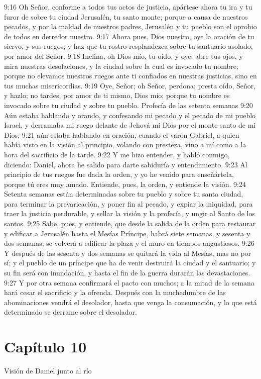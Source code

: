 9:16 Oh Señor, conforme a todos tus actos de justicia, apártese ahora tu ira y tu furor de sobre tu ciudad Jerusalén, tu santo monte; porque a causa de nuestros pecados, y por la maldad de nuestros padres, Jerusalén y tu pueblo son el oprobio de todos en derredor nuestro. 
9:17 Ahora pues, Dios nuestro, oye la oración de tu siervo, y sus ruegos; y haz que tu rostro resplandezca sobre tu santuario asolado, por amor del Señor. 
9:18 Inclina, oh Dios mío, tu oído, y oye; abre tus ojos, y mira nuestras desolaciones, y la ciudad sobre la cual es invocado tu nombre; porque no elevamos nuestros ruegos ante ti confiados en nuestras justicias, sino en tus muchas misericordias. 
9:19 Oye, Señor; oh Señor, perdona; presta oído, Señor, y hazlo; no tardes, por amor de ti mismo, Dios mío; porque tu nombre es invocado sobre tu ciudad y sobre tu pueblo. 
Profecía de las setenta semanas 
9:20 Aún estaba hablando y orando, y confesando mi pecado y el pecado de mi pueblo Israel, y derramaba mi ruego delante de Jehová mi Dios por el monte santo de mi Dios; 
9:21 aún estaba hablando en oración, cuando el varón Gabriel, a quien había visto en la visión al principio, volando con presteza, vino a mí como a la hora del sacrificio de la tarde. 
9:22 Y me hizo entender, y habló conmigo, diciendo: Daniel, ahora he salido para darte sabiduría y entendimiento. 
9:23 Al principio de tus ruegos fue dada la orden, y yo he venido para enseñártela, porque tú eres muy amado. Entiende, pues, la orden, y entiende la visión. 
9:24 Setenta semanas están determinadas sobre tu pueblo y sobre tu santa ciudad, para terminar la prevaricación, y poner fin al pecado, y expiar la iniquidad, para traer la justicia perdurable, y sellar la visión y la profecía, y ungir al Santo de los santos. 
9:25 Sabe, pues, y entiende, que desde la salida de la orden para restaurar y edificar a Jerusalén hasta el Mesías Príncipe, habrá siete semanas, y sesenta y dos semanas; se volverá a edificar la plaza y el muro en tiempos angustiosos. 
9:26 Y después de las sesenta y dos semanas se quitará la vida al Mesías, mas no por sí; y el pueblo de un príncipe que ha de venir destruirá la ciudad y el santuario; y su fin será con inundación, y hasta el fin de la guerra durarán las devastaciones. 
9:27 Y por otra semana confirmará el pacto con muchos; a la mitad de la semana hará cesar el sacrificio y la ofrenda. Después con la muchedumbre de las abominaciones vendrá el desolador, hasta que venga la consumación, y lo que está determinado se derrame sobre el desolador. 
\section*{Capítulo 10 }
Visión de Daniel junto al río 
 
